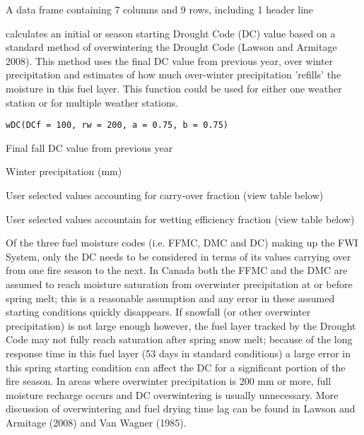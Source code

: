 \documentclass[a4paper]{book}
\begin{document}
%
\begin{Format}
A data frame containing 7 columns and 9 rows, including 1 header
line
\end{Format}
%
\begin{Description}\relax
{} calculates an initial or season starting Drought Code (DC) value
based on a standard method of overwintering the Drought Code (Lawson and
Armitage 2008).  This method uses the final DC value from previous year,
over winter precipitation and estimates of how much over-winter
precipitation 'refills' the moisture in this fuel layer. This function could
be used for either one weather station or for multiple weather stations.
\end{Description}
%
\begin{Usage}
\begin{verbatim}
wDC(DCf = 100, rw = 200, a = 0.75, b = 0.75)
\end{verbatim}
\end{Usage}
%
\begin{Arguments}
\begin{ldescription}
\item[\code{DCf}] Final fall DC value from previous year

\item[\code{rw}] Winter precipitation (mm)

\item[\code{a}] User selected values accounting for carry-over fraction (view table
below)

\item[\code{b}] User selected values accountain for wetting efficiency fraction
(view table below)
\end{ldescription}
\end{Arguments}
%
\begin{Details}\relax
Of the three fuel moisture codes (i.e. FFMC, DMC and DC) making up the FWI
System, only the DC needs to be considered in terms of its values carrying
over from one fire season to the next.  In Canada both the FFMC and the DMC
are assumed to reach moisture saturation from overwinter precipitation at or
before spring melt; this is a reasonable assumption and any error in these
assumed starting conditions quickly disappears.  If snowfall (or other
overwinter precipitation) is not large enough however, the fuel layer
tracked by the Drought Code may not fully reach saturation after spring snow
melt; because of the long response time in this fuel layer (53 days in
standard conditions) a large error in this spring starting condition can
affect the DC for a significant portion of the fire season.  In areas where
overwinter precipitation is 200 mm or more, full moisture recharge occurs
and DC overwintering is usually unnecessary.  More discussion of
overwintering and fuel drying time lag can be found in Lawson and Armitage
(2008) and Van Wagner (1985).
\end{Details}
\end{document}
